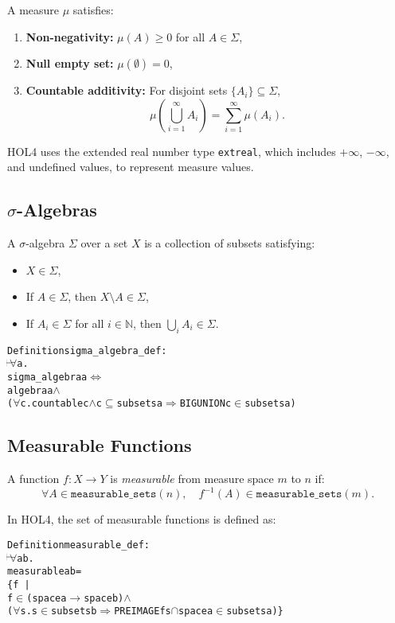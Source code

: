 A measure $ \mu $ satisfies:
\begin{enumerate}
  \item \textbf{Non-negativity:} $ \mu(A) \geq 0 $ for all $ A \in \Sigma $,
  \item \textbf{Null empty set:} $ \mu(\emptyset) = 0 $,
  \item \textbf{Countable additivity:} For disjoint sets $ \{A_i\} \subseteq \Sigma $,
  \[
    \mu\left(\bigcup_{i=1}^\infty A_i\right) = \sum_{i=1}^\infty \mu(A_i).
  \]
\end{enumerate}

HOL4 uses the extended real number type \texttt{extreal}, which includes $ +\infty $, $ -\infty $, and undefined values, to represent measure values.

\subsection{$\sigma$-Algebras}

A $\sigma$-algebra $ \Sigma $ over a set $ X $ is a collection of subsets satisfying:
\begin{itemize}
  \item $ X \in \Sigma $,
  \item If $ A \in \Sigma $, then $ X \setminus A \in \Sigma $,
  \item If $ A_i \in \Sigma $ for all $ i \in \mathbb{N} $, then $ \bigcup_i A_i \in \Sigma $.
\end{itemize}

\begin{hol}
  \begin{alltt}
    Definition sigma\_algebra\_def :
    \(\!\!\!{\turn}\!\!\!\!\) \(\forall\)a.
    sigma\_algebra a \(\Leftrightarrow\)
    algebra a \(\land\)
    (\(\forall\)c. countable c \(\land\) c \(\subseteq\) subsets a \(\Rightarrow\) BIGUNION c \(\in\) subsets a)
  \end{alltt}
\end{hol}


\subsection{Measurable Functions}

A function $ f : X \to Y $ is \emph{measurable} from measure space $ m $ to $ n $ if:
\[
  \forall A \in \texttt{measurable\_sets}(n),\quad f^{-1}(A) \in \texttt{measurable\_sets}(m).
\]

In HOL4, the set of measurable functions is defined as:
\begin{hol}
  \begin{alltt}
    Definition measurable\_def :
    \(\!\!\!{\turn}\!\!\!\!\) \(\forall\)a b.
    measurable a b =
    \{f \,|\,
    f \(\in\) (space a \(\rightarrow\) space b) \(\land\)
    (\(\forall\)s. s \(\in\) subsets b \(\Rightarrow\) PREIMAGE f s \(\cap\) space a \(\in\) subsets a)\}
  \end{alltt}
\end{hol}


